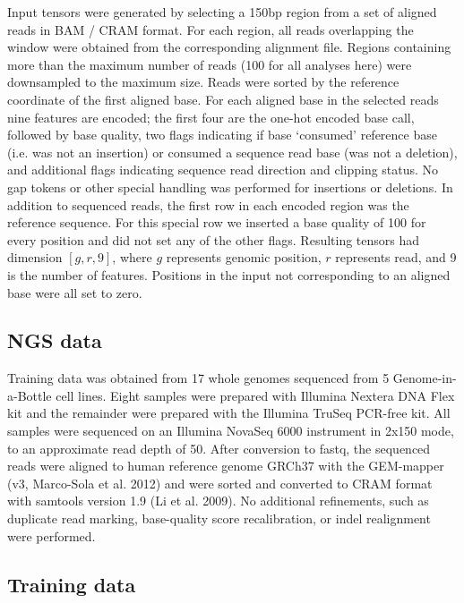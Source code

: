 \documentclass[]{article}
\begin{document}
Input tensors were generated by selecting a 150bp region from a set of aligned reads in BAM / CRAM format. For each region, all reads overlapping the window were obtained from the corresponding alignment file. Regions containing more than the maximum number of reads (100 for all analyses here) were downsampled to the maximum size.  Reads were sorted by the reference coordinate of the first aligned base. For each aligned base in the selected reads nine features are encoded; the first four are the one-hot encoded base call, followed by base quality, two flags indicating if base `consumed' reference base (i.e. was not an insertion) or consumed a sequence read base (was not a deletion), and additional flags indicating sequence read direction and clipping status.  No gap tokens or other special handling was performed for insertions or deletions. In addition to sequenced reads, the first row in each encoded region was the reference sequence. For this special row we inserted a base quality of 100 for every position and did not set any of the other flags. Resulting tensors had dimension $[g, r, 9]$, where $g$ represents genomic position, $r$ represents read, and 9 is the number of features. Positions in the input not corresponding to an aligned base were all set to zero. 


\subsection{NGS data}

Training data was obtained from 17 whole genomes sequenced from 5 Genome-in-a-Bottle cell lines. Eight samples were prepared with Illumina Nextera DNA Flex kit and the remainder were prepared with the Illumina TruSeq PCR-free kit. All samples were sequenced on an Illumina NovaSeq 6000 instrument in 2x150 mode, to an approximate read depth of 50. After conversion to fastq, the sequenced reads were aligned to human reference genome GRCh37 with the GEM-mapper (v3, Marco-Sola et al. 2012) and were sorted and converted to CRAM format with samtools version 1.9 (Li et al. 2009). No additional refinements, such as duplicate read marking, base-quality score recalibration, or indel realignment were performed.

\subsection{Training data}
\end{document}
